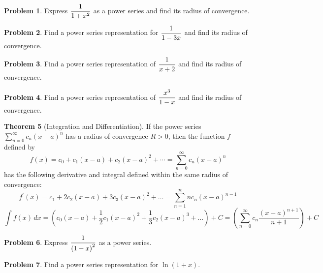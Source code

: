 \documentclass[letterpaper, twoside, 12pt]{book}
\theoremstyle{definition}
\newtheorem{theorem}{Theorem}
\theoremstyle{definition}
\newtheorem{problem}[theorem]{Problem}
\newcommand{\ds}{\ensuremath{\displaystyle}}
\begin{document}
\begin{problem}
 Express $\ds \frac{1}{1+x^2}$ as a power series and find its
 radius of convergence.
\end{problem}

\vfill

\begin{problem}
 Find a power series representation for $\ds \frac{1}{1-3x}$ and find its
 radius of convergence.
\end{problem}

\vfill

\newpage

\begin{problem}
 Find a power series representation of $\ds \frac{1}{x+2}$ and find
 its radius of convergence.
\end{problem}

\vfill

\begin{problem}
 Find a power series representation of $\ds \frac{x^3}{1-x}$ and find
 its radius of convergence.
\end{problem}

\vfill

\newpage

\begin{theorem}[Integration and Differentiation]
 If the power series $\sum_{n=0}^{\infty} c_n\left(x-a\right)^n$ has a radius
 of convergence $R > 0$, then the function $f$ defined by
  \[
    f(x) = c_0 + c_1\left(x-a\right) + c_2\left(x-a\right)^2 + \cdots
         = \sum_{n=0}^{\infty} c_n\left(x-a\right)^n
  \]
 has the following derivative and integral defined within the same radius
 of convergence:
 \[
  f^\prime(x) = c_1 + 2c_2(x-a) + 3c_3(x-a)^2 + \dots
              = \sum_{n=1}^{\infty} nc_n\left(x-a\right)^{n-1}
 \]
 \[
  \int f(x) \, dx
   =
  \left(c_0(x-a) + \frac{1}{2}c_1(x-a)^2 + \frac{1}{3}c_2(x-a)^3+\dots \right) + C
   =
  \left(\sum_{n=0}^{\infty} c_n \frac{\left(x-a\right)^{n+1}}{n+1}\right) + C
 \]
\end{theorem}

\begin{problem}
 Express $\ds \frac{1}{\left(1-x\right)^2}$ as a power series.
\end{problem}

\vfill

\newpage

\begin{problem}
 Find a power series representation for $\ln\left(1+x\right)$.
\end{problem}
\end{document}
